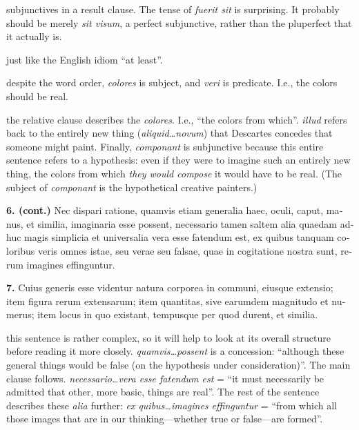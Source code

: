  subjunctives in a result clause. The tense of \textit{fuerit sit} is surprising. It probably should be merely \textit{sit visum}, a perfect subjunctive, rather than the pluperfect that it actually is.

 just like the English idiom ``at least''.

 despite the word order, \textit{colores} is subject, and \textit{veri} is predicate. I.e., the colors should be real.

 the relative clause describes the \textit{colores}. I.e., ``the colors from which''. \textit{illud} refers back to the entirely new thing (\textit{aliquid\dots novum}) that Descartes concedes that someone might paint. Finally, \textit{componant} is subjunctive because this entire sentence refers to a hypothesis: even if they were to imagine such an entirely new thing, the colors from which \textit{they would compose} it would have to be real. (The subject of \textit{componant} is the hypothetical creative painters.)

\clearpage

\beginnumbering
\pstart
{}
\begin{latin}
    \textenglish{\textbf{6. (cont.)}} Nec dispari ratione, quamvis etiam generalia haec, oculi, caput, manus, et similia, imaginaria esse possent, necessario tamen saltem alia quaedam adhuc magis simplicia et universalia vera esse fatendum est, ex quibus tanquam coloribus veris omnes istae, seu verae seu falsae, quae in cogitatione nostra sunt, rerum imagines effinguntur.
\end{latin}
\pend
\endnumbering

\beginnumbering
\pstart
\begin{latin}
   \textenglish{\textbf{7.}} Cuius generis esse videntur natura corporea in communi, eiusque extensio; item figura rerum extensarum; item quantitas, sive earumdem magnitudo et numerus; item locus in quo existant, tempusque per quod durent, et similia.
\end{latin}
\pend
\endnumbering

\prenotes

 this sentence is rather complex, so it will help to look at its overall structure before reading it more closely. \textit{quamvis\dots possent} is a concession: ``although these general things would be false (on the hypothesis under consideration)''. The main clause follows. \textit{necessario\dots vera esse fatendum est} = ``it must necessarily be admitted that other, more basic, things are real''. The rest of the sentence describes these \textit{alia} further: \textit{ex quibus\dots imagines effinguntur} = ``from which all those images that are in our thinking---whether true or false---are formed''.


